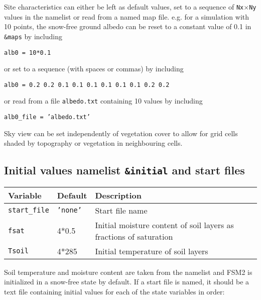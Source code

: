 \documentclass{article}
\begin{document}
Site characteristics can either be left as default values, set to a sequence of {\tt Nx$\times$Ny} values in the namelist or read from a named map file. e.g. for a simulation with 10 points, the snow-free ground albedo can be reset to a constant value of 0.1 in {\tt \&maps} by including

{\tt alb0 = 10*0.1}

or set to a sequence (with spaces or commas) by including

{\tt alb0 = 0.2 0.2 0.1 0.1 0.1 0.1 0.1 0.1 0.2 0.2} 

or read from a file {\tt albedo.txt} containing 10 values by including

{\tt alb0\_file = 'albedo.txt'}

Sky view can be set independently of vegetation cover to allow for grid cells shaded by topography or vegetation in neighbouring cells.

\subsection*{Initial values namelist {\tt \&initial} and start files}

\begin{tabular}{|l|l|l|}
\hline
Variable & Default & Description \\
\hline
{\tt start\_file}  & {\tt 'none'}  & Start file name                                      \\
{\tt fsat}  & 4*0.5  & Initial moisture content of soil layers as fractions of saturation \\
{\tt Tsoil} & 4*285  & Initial temperature of soil layers                                 \\

\hline 
\end{tabular}

Soil temperature and moisture content are taken from the namelist and FSM2 is initialized in a snow-free state by default. If a start file is named, it should be a text file containing initial values for each of the state variables in order:
\end{document}
